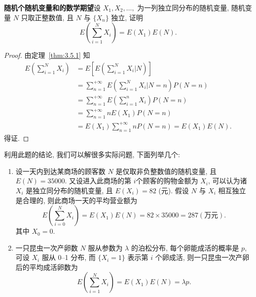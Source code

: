 	\begin{example}\label{exam:3.5.10}
		\textbf{随机个随机变量和的数学期望}\quad 设 $X_1,X_2,\ldots,$ 为一列独立同分布的随机变量, 随机变量 $N$
		只取正整数值, 且 $N$ 与 $\{X_n\}$ 独立, 证明
		\[
			E\left(\sum_{i=1}^{N} X_{i}\right)=E\left(X_{1}\right) E(N).
			\]
	\end{example}
	\begin{proof}
		由定理~\ref{thm:3.5.1} 知
		\begin{align*}
			E\left(\sum_{i=1}^{N} X_{i}\right) &=E\left[E\left(\sum_{i=1}^{N} X_{i} | N\right)\right] \\
			&=\sum_{n=1}^{+\infty} E\left(\sum_{i=1}^{N} X_{i} | N=n\right) P(N=n) \\
			&=\sum_{n=1}^{+\infty} E\left(\sum_{i=1}^{n} X_{i}\right) P(N=n) \\
			&=\sum_{n=1}^{+\infty} n E\left(X_{1}\right) P(N=n) \\
			&=E\left(X_{1}\right) \sum_{n=1}^{+\infty} n P(N=n)=E\left(X_{1}\right) E(N).
		\end{align*}
		得证.
	\end{proof}
	利用此题的结论, 我们可以解很多实际问题, 下面列举几个:
	\begin{enumerate}
		\item 设一天内到达某商场的顾客数 $N$ 是仅取非负整数值的随机变量, 且 $E(N)=35000$. 又设进入此商场的第 $i$个顾客的购物金额为 $X_i$, 可以认为诸 $X_i$ 是独立同分布的随机变量, 且 $E(X_i)=82$ (元). 假设 $N$ 与
		 $X_i$ 相互独立是合理的, 则此商场一天的平均营业额为
		 \[
			E\left(\sum_{i=0}^{N} X_{i}\right)=E\left(X_{1}\right) E(N)=82 \times 35000=287 (\text{万元}).
			\]
		其中 $X_0=0$.
		\item 一只昆虫一次产卵数 $N$ 服从参数为 $\lambda$ 的泊松分布, 每个卵能成活的概率是 $p$, 可设 $X_i$
		服从 0--1 分布, 而 $\{X_i=1\}$ 表示第 $i$ 个卵成活, 则一只昆虫一次产卵后的平均成活卵数为
		\[
			E\left(\sum_{i=1}^{N} X_{i}\right)=E\left(X_{1}\right) E(N)=\lambda p.
			\]
	\end{enumerate}
